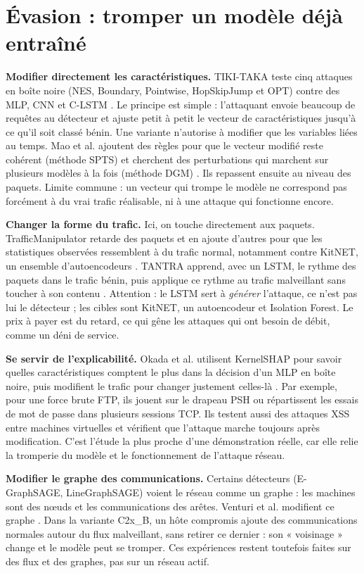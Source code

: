 \documentclass[a4paper,10pt]{article}
\begin{document}
\section{Évasion : tromper un modèle déjà entraîné}
\textbf{Modifier directement les caractéristiques.} TIKI-TAKA teste cinq
attaques en boîte noire (NES, Boundary, Pointwise, HopSkipJump et OPT) contre
des MLP, CNN et C-LSTM \cite{zhang}. Le principe est simple : l'attaquant
envoie beaucoup de requêtes au détecteur et ajuste petit à petit le vecteur de
caractéristiques jusqu'à ce qu'il soit classé bénin. Une variante n'autorise à
modifier que les variables liées au temps. Mao et al. ajoutent des règles pour
que le vecteur modifié reste cohérent (méthode SPTS) et cherchent des
perturbations qui marchent sur plusieurs modèles à la fois (méthode DGM)
\cite{mao}. Ils repassent ensuite au niveau des paquets. Limite commune : un
vecteur qui trompe le modèle ne correspond pas forcément à du vrai trafic
réalisable, ni à une attaque qui fonctionne encore.

\textbf{Changer la forme du trafic.} Ici, on touche directement aux paquets.
TrafficManipulator retarde des paquets et en ajoute d'autres pour que les
statistiques observées ressemblent à du trafic normal, notamment contre
KitNET, un ensemble d'autoencodeurs \cite{han}. TANTRA apprend, avec un LSTM,
le rythme des paquets dans le trafic bénin, puis applique ce rythme au trafic
malveillant sans toucher à son contenu \cite{tantra}. Attention : le LSTM sert
à \emph{générer} l'attaque, ce n'est pas lui le détecteur ; les cibles sont
KitNET, un autoencodeur et Isolation Forest. Le prix à payer est du retard, ce
qui gêne les attaques qui ont besoin de débit, comme un déni de service.

\textbf{Se servir de l'explicabilité.} Okada et al. utilisent KernelSHAP pour
savoir quelles caractéristiques comptent le plus dans la décision d'un MLP en
boîte noire, puis modifient le trafic pour changer justement celles-là
\cite{okada}. Par exemple, pour une force brute FTP, ils jouent sur le drapeau
PSH ou répartissent les essais de mot de passe dans plusieurs sessions TCP.
Ils testent aussi des attaques XSS entre machines virtuelles et vérifient que
l'attaque marche toujours après modification. C'est l'étude la plus proche
d'une démonstration réelle, car elle relie la tromperie du modèle et le
fonctionnement de l'attaque réseau.

\textbf{Modifier le graphe des communications.} Certains détecteurs
(E-GraphSAGE, LineGraphSAGE) voient le réseau comme un graphe : les machines
sont des nœuds et les communications des arêtes. Venturi et al. modifient ce
graphe \cite{venturi}. Dans la variante C2x\_B, un hôte compromis ajoute des
communications normales autour du flux malveillant, sans retirer ce dernier :
son « voisinage » change et le modèle peut se tromper. Ces expériences restent
toutefois faites sur des flux et des graphes, pas sur un réseau actif.
\end{document}
